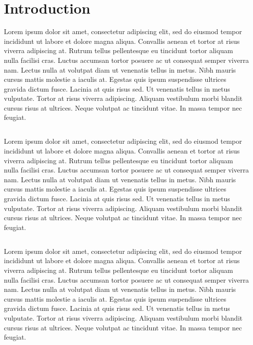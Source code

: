 \chapter{Introduction}\label{intro}
Lorem ipsum dolor sit amet, consectetur adipiscing elit, sed do eiusmod tempor incididunt ut labore et dolore magna aliqua. Convallis aenean et tortor at risus viverra adipiscing at. Rutrum tellus pellentesque eu tincidunt tortor aliquam nulla facilisi cras. Luctus accumsan tortor posuere ac ut consequat semper viverra nam. Lectus nulla at volutpat diam ut venenatis tellus in metus. Nibh mauris cursus mattis molestie a iaculis at. Egestas quis ipsum suspendisse ultrices gravida dictum fusce. Lacinia at quis risus sed. Ut venenatis tellus in metus vulputate. Tortor at risus viverra adipiscing. Aliquam vestibulum morbi blandit cursus risus at ultrices. Neque volutpat ac tincidunt vitae. In massa tempor nec feugiat.


\section{}

Lorem ipsum dolor sit amet, consectetur adipiscing elit, sed do eiusmod tempor incididunt ut labore et dolore magna aliqua. Convallis aenean et tortor at risus viverra adipiscing at. Rutrum tellus pellentesque eu tincidunt tortor aliquam nulla facilisi cras. Luctus accumsan tortor posuere ac ut consequat semper viverra nam. Lectus nulla at volutpat diam ut venenatis tellus in metus. Nibh mauris cursus mattis molestie a iaculis at. Egestas quis ipsum suspendisse ultrices gravida dictum fusce. Lacinia at quis risus sed. Ut venenatis tellus in metus vulputate. Tortor at risus viverra adipiscing. Aliquam vestibulum morbi blandit cursus risus at ultrices. Neque volutpat ac tincidunt vitae. In massa tempor nec feugiat.



\section{}

Lorem ipsum dolor sit amet, consectetur adipiscing elit, sed do eiusmod tempor incididunt ut labore et dolore magna aliqua. Convallis aenean et tortor at risus viverra adipiscing at. Rutrum tellus pellentesque eu tincidunt tortor aliquam nulla facilisi cras. Luctus accumsan tortor posuere ac ut consequat semper viverra nam. Lectus nulla at volutpat diam ut venenatis tellus in metus. Nibh mauris cursus mattis molestie a iaculis at. Egestas quis ipsum suspendisse ultrices gravida dictum fusce. Lacinia at quis risus sed. Ut venenatis tellus in metus vulputate. Tortor at risus viverra adipiscing. Aliquam vestibulum morbi blandit cursus risus at ultrices. Neque volutpat ac tincidunt vitae. In massa tempor nec feugiat.



